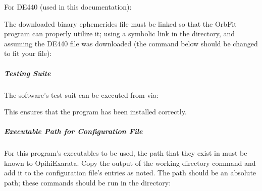\documentclass[letterpaper,11pt,english]{sphinxmanual}
\begin{document}
\sphinxAtStartPar
For DE440 (used in this documentation):

\begin{sphinxVerbatim}[commandchars=\\\{\}]
  
\end{sphinxVerbatim}

\sphinxAtStartPar
The downloaded binary ephemerides file must be linked so that the OrbFit
program can properly utilize it; using a symbolic link in the 
directory, and assuming the DE440 file was downloaded (the command below
should be changed to fit your file):

\begin{sphinxVerbatim}[commandchars=\\\{\}]
 
   
 
\end{sphinxVerbatim}


\subparagraph{Testing Suite}
\label{\detokenize{technical/installation/orbfit:testing-suite}}
\sphinxAtStartPar
The software’s test suit can be executed from  via:

\begin{sphinxVerbatim}[commandchars=\\\{\}]
 
\end{sphinxVerbatim}

\sphinxAtStartPar
This ensures that the program has been installed correctly.


\subparagraph{Executable Path for Configuration File}
\label{\detokenize{technical/installation/orbfit:executable-path-for-configuration-file}}
\sphinxAtStartPar
For this program’s executables to be used, the path that they exist in must
be known to OpihiExarata. Copy the output of the working directory command
and add it to the configuration file’s entries as noted. The path should be
an absolute path; these commands should be run in the  directory:
\end{document}
